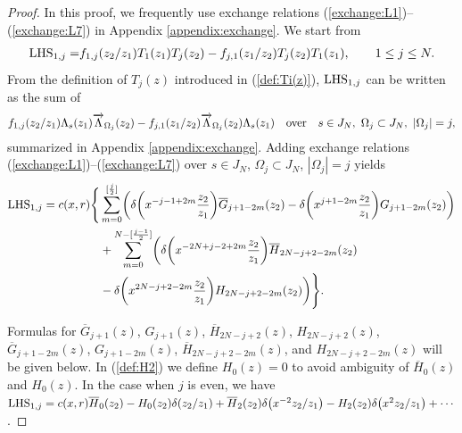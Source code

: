 \documentclass[pdftex]{sigma}
\numberwithin{equation}{section}
\begin{document}
\begin{proof}
{In this proof, we frequently use exchange relations
(\ref{exchange:L1})--(\ref{exchange:L7}) in Appendix \ref{appendix:exchange}.}
We start from
\begin{gather*}
{{\rm LHS}_{1,j}=}f_{1,j}(z_2/z_1)T_1(z_1)T_j(z_2)-f_{j,1}(z_1/z_2)T_j(z_2)T_1(z_1),\qquad
1\leq j \leq N.
\end{gather*}
From the definition of $T_j(z)$ introduced in (\ref{def:Ti(z)}),
${\rm LHS}_{1,j}$ can be written {as} the sum of
\begin{gather*}
f_{1,j}(z_2/z_1)\Lambda_s(z_1)
\overrightarrow{\Lambda}_{\Omega_j}(z_2)-f_{j,1}(z_1/z_2)
\overrightarrow{\Lambda}_{\Omega_j}(z_2)\Lambda_s(z_1)\quad
{\rm over}\quad
s \in J_N,\  \Omega_j \subset J_N,\  |\Omega_j|=j,
\end{gather*}
summarized in Appendix \ref{appendix:exchange}.
Adding exchange relations (\ref{exchange:L1})--(\ref{exchange:L7})
over $s \in J_N$, $\Omega_j \subset J_N$, $|\Omega_j|=j$ yields
\begin{align}
{\rm LHS}_{1,j}={}c(x,r)
\Biggl\{&\sum_{m=0}^{[\frac{j}{2}]}
\biggl(\delta\biggl(x^{-j-1+2m}\frac{z_2}{z_1}\biggr){\overline{G}_{j+1-2m}(z_2)}
-\delta\biggl(x^{j+1-2m}\frac{z_2}{z_1}\biggr){{G}_{j+1-2m}(z_2)}\biggr)\notag
\\
&+\sum_{m=0}^{N-[\frac{j-1}{2}]}
\biggl(\delta\biggl(x^{-2N+j-2+2m}\frac{z_2}{z_1}\biggr)
{\overline{H}_{2N-j+2-2m}(z_2)}\notag
\\
&-\delta\biggl(x^{2N-j+2-2m}\frac{z_2}{z_1}\biggr)
{H_{2N-j+2-2m}(z_2)}
\biggr)\Biggr\}.
\label{eqn:L1j-2}
\end{align}
{\sloppy
Formulas for $\overline{G}_{j+1}(z)$, $G_{j+1}(z)$, $\overline{H}_{2N-j+2}(z)$, $H_{2N-j+2}(z)$,
$\overline{G}_{j+1-2m}(z)$, $G_{j+1-2m}(z)$, $\overline{H}_{2N-j+2-2m}(z)$, and $H_{2N-j+2-2m}(z)$
will be given below. In (\ref{def:H2}) we define $H_0(z)=0$ to avoid ambiguity of
$\overline{H}_0(z)$ and $H_0(z)$. In the case when $j$ {is} even, we have
${\rm LHS}_{1,j}=c(x,r)\overline{H}_0(z_2)-H_0(z_2)\delta(z_2/z_1)+
\overline{H}_2(z_2)\delta\big(x^{-2}z_2/z_1\big)-H_2(z_2)\delta\big(x^2z_2/z_1\big)+\cdots$.

}


\end{proof}
\end{document}
